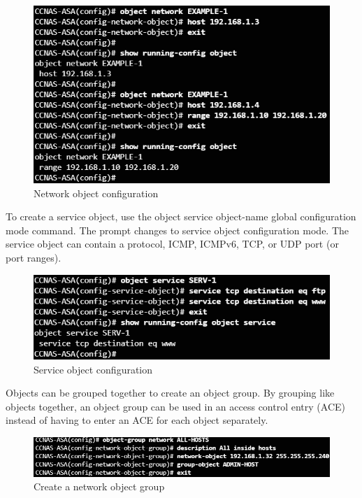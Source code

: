 \begin{figure}[hbtp]
\caption{Network object configuration}\label{NetObject}
\centering
\includegraphics[scale=0.5]{pictures/NetObject.PNG}
\end{figure}

To create a service object, use the object service object-name global configuration mode command. The prompt changes to service object configuration mode. The service object can contain a protocol, ICMP, ICMPv6, TCP, or UDP port (or port ranges).

\begin{figure}[hbtp]
\caption{Service object configuration}\label{ServObject}
\centering
\includegraphics[scale=0.5]{pictures/ServObject.PNG}
\end{figure}

Objects can be grouped together to create an object group. By grouping like objects together, an object group can be used in an access control entry (ACE) instead of having to enter an ACE for each object separately.

\begin{figure}[hbtp]
\caption{Create a network object group}\label{NetObjGrp}
\centering
\includegraphics[scale=0.7]{pictures/NetObjGrp.PNG}
\end{figure}

